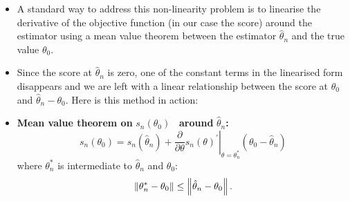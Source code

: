 \documentclass[notes=show]{beamer}
\begin{document}
\begin{frame}%


\begin{itemize}
\item A standard way to address this non-linearity problem is to linearise
the derivative of the objective function (in our case the score) around the
estimator using a mean value theorem between the estimator $\hat{\theta}_{n}$
and the true value $\theta _{0}$.

\item Since the score at $\hat{\theta}_{n}$ is zero, one of the constant
terms in the linearised form disappears and we are left with a linear
relationship between the score at $\theta _{0}$ and $\hat{\theta}_{n}-\theta
_{0}$. Here is this method in action:

\item \textbf{Mean value theorem on }$s_{n}\left( \theta _{0}\right) $%
\textbf{\ around }$\hat{\theta}_{n}$\textbf{:}%
\begin{equation}
s_{n}\left( \theta _{0}\right) =s_{n}\left( \hat{\theta}_{n}\right) +\left. 
\frac{\partial }{\partial \theta }s_{n}\left( \theta \right) ^{\prime
}\right\vert _{\theta =\theta _{n}^{\ast }}\left( \theta _{0}-\hat{\theta}%
_{n}\right)   \label{MVT}
\end{equation}%
where $\theta _{n}^{\ast }$ is intermediate to $\hat{\theta}_{n}$ and $%
\theta _{0}$:%
\begin{equation}
\left\Vert \theta _{n}^{\ast }-\theta _{0}\right\Vert \leq \left\Vert \hat{%
\theta}_{n}-\theta _{0}\right\Vert .  \label{interm}
\end{equation}
\end{itemize}

\end{frame}%
\end{document}
